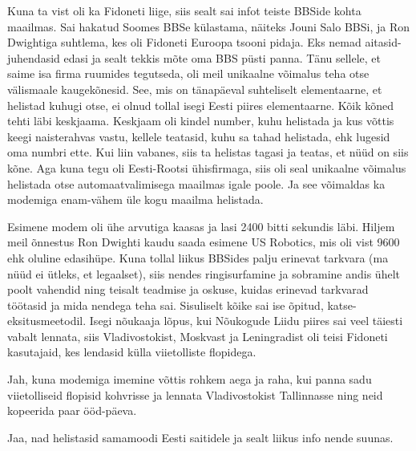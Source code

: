 Kuna ta vist oli ka Fidoneti liige, siis sealt sai infot teiste BBSide 
kohta maailmas. Sai hakatud Soomes BBSe külastama, näiteks Jouni Salo 
BBSi, ja Ron Dwightiga suhtlema, kes oli Fidoneti Euroopa tsooni pidaja. Eks nemad aitasid-juhendasid edasi 
ja sealt tekkis mõte oma BBS püsti panna. Tänu sellele, et saime 
isa firma ruumides tegutseda, oli meil unikaalne võimalus teha otse välismaale 
kaugekõnesid. See, mis on tänapäeval suhteliselt elementaarne, et helistad kuhugi
otse, ei olnud tollal isegi Eesti piires elementaarne. Kõik kõned 
tehti läbi keskjaama. Keskjaam oli kindel number, kuhu helistada ja 
kus võttis keegi naisterahvas vastu, kellele teatasid, kuhu sa tahad 
helistada, ehk lugesid oma numbri ette. Kui liin vabanes, siis ta helistas 
tagasi ja teatas, et nüüd on siis kõne. Aga kuna tegu oli Eesti-Rootsi 
ühisfirmaga, siis oli seal unikaalne võimalus helistada otse automaatvalimisega maailmas igale poole. Ja see võimaldas ka modemiga enam-vähem 
üle kogu maailma helistada.


Esimene modem oli ühe arvutiga kaasas ja lasi 2400 bitti sekundis läbi. Hiljem meil õnnestus Ron Dwighti kaudu 
saada esimene US Robotics, mis oli vist 9600 ehk oluline edasihüpe. Kuna tollal liikus BBSides palju 
erinevat tarkvara (ma nüüd ei ütleks, et legaalset), siis nendes ringisurfamine ja sobramine andis ühelt poolt vahendid ning teisalt teadmise ja oskuse, 
kuidas erinevad tarkvarad töötasid ja mida nendega teha sai. 
Sisuliselt kõike sai ise õpitud, katse-eksitusmeetodil. Isegi nõukaaja lõpus, kui Nõukogude Liidu piires sai veel täiesti vabalt lennata, siis Vladivostokist, Moskvast ja Leningradist oli teisi Fidoneti 
kasutajaid, kes lendasid külla viietolliste flopidega.


Jah, kuna modemiga imemine võttis rohkem aega ja raha, kui panna
sadu viietolliseid flopisid kohvrisse ja lennata Vladivostokist 
Tallinnasse ning neid kopeerida paar ööd-päeva.


Jaa, nad helistasid samamoodi Eesti saitidele ja sealt liikus info nende 
suunas. 


